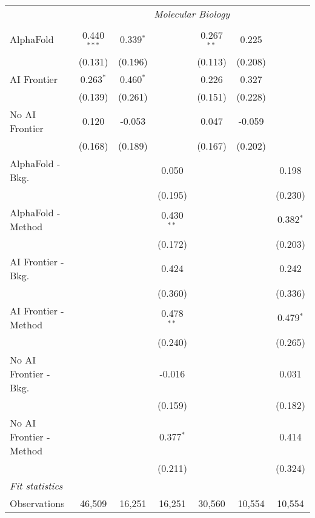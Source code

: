 \begin{tabular}{lcccccc}
 & \multicolumn{6}{c}{\textit{Molecular Biology}} \\ \\
   AlphaFold               & 0.440$^{***}$ & 0.339$^{*}$ &              & 0.267$^{**}$ & 0.225   &   \\   
                           & (0.131)       & (0.196)     &              & (0.113)      & (0.208) &   \\   
   AI Frontier             & 0.263$^{*}$   & 0.460$^{*}$ &              & 0.226        & 0.327   &   \\   
                           & (0.139)       & (0.261)     &              & (0.151)      & (0.228) &   \\   
   No AI Frontier          & 0.120         & -0.053      &              & 0.047        & -0.059  &   \\   
                           & (0.168)       & (0.189)     &              & (0.167)      & (0.202) &   \\   
   AlphaFold - Bkg.        &               &             & 0.050        &              &         & 0.198\\   
                           &               &             & (0.195)      &              &         & (0.230)\\   
   AlphaFold - Method      &               &             & 0.430$^{**}$ &              &         & 0.382$^{*}$\\   
                           &               &             & (0.172)      &              &         & (0.203)\\   
   AI Frontier - Bkg.      &               &             & 0.424        &              &         & 0.242\\   
                           &               &             & (0.360)      &              &         & (0.336)\\   
   AI Frontier - Method    &               &             & 0.478$^{**}$ &              &         & 0.479$^{*}$\\   
                           &               &             & (0.240)      &              &         & (0.265)\\   
   No AI Frontier - Bkg.   &               &             & -0.016       &              &         & 0.031\\   
                           &               &             & (0.159)      &              &         & (0.182)\\   
   No AI Frontier - Method &               &             & 0.377$^{*}$  &              &         & 0.414\\   
                           &               &             & (0.211)      &              &         & (0.324)\\   
   \midrule
   \emph{Fit statistics}\\
   Observations            & 46,509        & 16,251      & 16,251       & 30,560       & 10,554  & 10,554\\  
   

\end{tabular}
